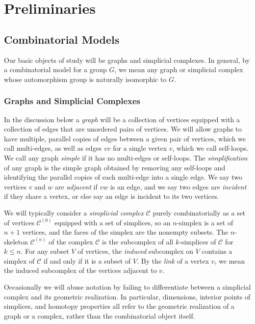 \chapter{Preliminaries}

\section{Combinatorial Models}

Our basic objects of study will be graphs and simplicial complexes.
In general,
by
a combinatorial model for a group $G$,
we mean any graph or simplicial complex
whose automorphism group is naturally isomorphic to $G$.



\subsection{Graphs and Simplicial Complexes}

In the discussion below a \emph{graph}
will be a collection of vertices equipped with a collection of edges that are unordered pairs of vertices.
We will allow graphs to have
multiple, parallel copies of edges between
a given pair of vertices, which we call multi-edges,
as well as edges $vv$ for a single vertex $v$, which we call self-loops.
We call any graph \emph{simple} if it has no multi-edges or self-loops.
The \emph{simplification} of any graph is the simple graph obtained by removing any self-loops and identifying the parallel copies of each multi-edge into a single edge.
We say two vertices $v$ and $w$ are \emph{adjacent} if $vw$ is an edge, and we say two edges are
\emph{incident} if they share a vertex, or else say an edge is incident to its two vertices.

We will typically consider  a \emph{simplicial complex}
$\mathcal C$ purely combinatorially as a set of vertices $\mathcal C^{(0)}$ equipped with a set of simplices,
so an $n$-simplex is a set of $n+1$ vertices, and the faces of the simplex are the nonempty subsets.
The $n$-skeleton $\mathcal C^{(n)}$ of the complex $\mathcal C$ is the subcomplex of all $k$-simplices of $\mathcal C$ for $k \leq n$.
For any subset $V$ of vertices, the \emph{induced} subcomplex on $V$ contains a simplex of $\mathcal C$ if and only if it is a subset of $V$.
By the \emph{link} of a vertex $v$,
we mean the
induced subcomplex of the vertices adjacent to $v$.

Occasionally we will abuse notation by failing to differentiate between a simplicial complex and its geometric realization.
In particular, dimensions, interior points of simplices, and homotopy properties all refer to the geometric realization of a graph or a complex, rather than the combinatorial object itself.

